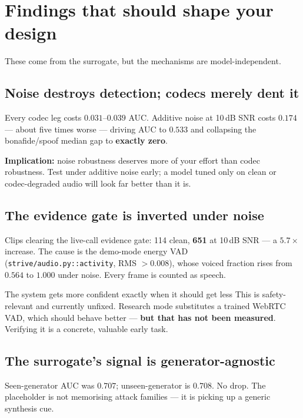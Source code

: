 \documentclass[11pt,a4paper]{article}
\newcommand{\code}[1]{\texttt{\small #1}}
\begin{document}
\section{Findings that should shape your design}

These come from the surrogate, but the mechanisms are model-independent.

\subsection{Noise destroys detection; codecs merely dent it}

Every codec leg costs $0.031$--$0.039$ AUC. Additive noise at 10\,dB SNR costs
$\mathbf{0.174}$ --- about five times worse --- driving AUC to $0.533$ and
collapsing the bonafide/spoof median gap to \textbf{exactly zero}.

\textbf{Implication:} noise robustness deserves more of your effort than codec
robustness. Test under additive noise early; a model tuned only on clean or
codec-degraded audio will look far better than it is.

\subsection{The evidence gate is inverted under noise}

Clips clearing the live-call evidence gate: 114 clean, \textbf{651} at 10\,dB SNR
--- a $5.7\times$ increase. The cause is the demo-mode energy VAD
(\code{strive/audio.py::activity}, RMS $> 0.008$), whose voiced fraction rises from
$0.564$ to $1.000$ under noise. Every frame is counted as speech.

\begin{warnbox}{The system gets more confident exactly when it should get less}
This is safety-relevant and currently unfixed. Research mode substitutes a trained
WebRTC VAD, which should behave better --- \textbf{but that has not been measured}.
Verifying it is a concrete, valuable early task.
\end{warnbox}

\subsection{The surrogate's signal is generator-agnostic}

Seen-generator AUC was $0.707$; unseen-generator is $0.708$. No drop. The
placeholder is not memorising attack families --- it is picking up a generic
synthesis cue.
\end{document}
